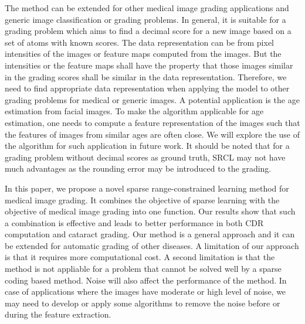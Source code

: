\documentclass[journal]{IEEEtran}
\begin{document}
The method can be extended for other medical image grading
applications and generic image classification or grading
problems. In general, it is suitable for a grading problem which
aims to find a decimal score for a new image based on a set
of atoms with known scores. The data representation can be
from pixel intensities of the images or feature maps computed
from the images. But the intensities or the feature maps shall
have the property that those images similar in the grading
scores shall be similar in the data representation. Therefore,
we need to find appropriate data representation when applying
the model to other grading problems for medical or generic
images. A potential application is the age estimation from
facial images. To make the algorithm applicable for age
estimation, one needs to compute a feature representation of
the images such that the features of images from similar ages
are often close. We will explore the use of the algorithm for
such application in future work. It should be noted that for
a grading problem without decimal scores as ground truth,
SRCL may not have much advantages as the rounding error
may be introduced to the grading.

In this paper, we propose a novel sparse range-constrained
learning method for medical image grading. It combines the
objective of sparse learning with the objective of medical
image grading into one function. Our results show that such
a combination is effective and leads to better performance
in both CDR computation and cataract grading. Our method
is a general approach and it can be extended for automatic
grading of other diseases. A limitation of our approach is that
it requires more computational cost. A second limitation is
that the method is not appliable for a problem that cannot be
solved well by a sparse coding based method. Noise will also
affect the performance of the method. In case of applications
where the images have moderate or high level of noise, we
may need to develop or apply some algorithms to remove the
noise before or during the feature extraction.


   


 
\end{document}
